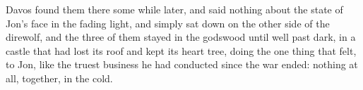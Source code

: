 Davos found them there some while later, and said nothing about the state of Jon’s face in the fading light, and simply sat down on the other side of the direwolf, and the three of them stayed in the godswood until well past dark, in a castle that had lost its roof and kept its heart tree, doing the one thing that felt, to Jon, like the truest business he had conducted since the war ended: nothing at all, together, in the cold.